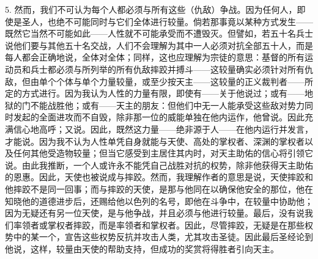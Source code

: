 5. 然而，我们不可认为每个人都必须与所有这些（仇敌）争战。因为任何人，即使是圣人，也绝不可能同时与它们全体进行较量。倘若那事竟以某种方式发生——既然它当然不可能如此——人性就不可能承受而不遭毁灭。但譬如，若五十名兵士说他们要与其他五十名交战，人们不会理解为其中一人必须对抗全部五十人，而是每人都会正确地说，全体对全体；同样，这也应理解为宗徒的意思：基督的所有运动员和兵士都必须与所列举的所有仇敌摔跤并搏斗——这较量确实必须针对所有仇敌，但由单个个体与单个力量较量，或至少按天主——这较量的正义裁判者——所定的方式进行。因为我认为人性的力量有限，即使有——关于他说过；或有——地狱的门不能战胜他；或有——天主的朋友：但他们中无一人能承受这些敌对势力同时发起的全面进攻而不自毁，除非那一位的威能单独在他内运作，他曾说。因此充满信心地高呼；又说。因此，既然这力量——绝非源于人——在他内运行并发言，才能说。因为我不认为人性单凭自身就能与天使、高处的掌权者、深渊的掌权者以及任何其他受造物较量；但当它感受到主居住其内时，对天主助佑的信心将引领它说。由此我推断，一个人或许永不能凭自己战胜对抗的权势，除非他获得天主助佑的恩惠。因此，天使也被说成与摔跤。然而，我理解作者的意思是说，天使摔跤和他摔跤不是同一回事；而与摔跤的天使，是那与他同在以确保他安全的那位，他在知晓他的道德进步后，还赐给他以色列的名号，即他在斗争中，在较量中协助他；因为无疑还有另一位天使，是与他争战，并且必须与他进行较量。最后，没有说我们率领者或掌权者摔跤，而是率领者和掌权者。因此，尽管摔跤，无疑是在那些权势中的某一个，宣告这些权势反抗并攻击人类，尤其攻击圣徒。因此最后圣经论到他说，这样，较量由天使的帮助支持，但成功的奖赏将得胜者引向天主。\par

